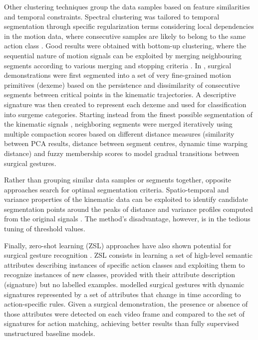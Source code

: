 \documentclass[journal]{IEEEtran}
\begin{document}
Other clustering techniques group the data samples based on feature similarities and temporal constraints.
Spectral clustering was tailored to temporal segmentation through specific regularization terms considering local dependencies in the motion data, where consecutive samples are likely to belong to the same action class \cite{Clopton2017}.
Good results were obtained with bottom-up clustering, where the sequential nature of motion signals can be exploited by merging neighbouring segments according to various merging and stopping criteria \cite{Despinoy2016, Fard2017}. 
In \cite{Despinoy2016}, surgical demonstrations were first segmented into a set of very fine-grained motion primitives (dexeme) based on the persistence and dissimilarity of consecutive segments between critical points in the kinematic trajectories.
A descriptive signature was then created to represent each dexeme and used for classification into surgeme categories. 
Starting instead from the finest possible segmentation of the kinematic signals \cite{Fard2017},
neighboring segments were merged iteratively using multiple compaction scores based on different distance measures (similarity between PCA results, distance between segment centres, dynamic time warping distance) and fuzzy membership scores to model gradual transitions between surgical gestures.

Rather than grouping similar data samples or segments together, opposite approaches search for optimal segmentation criteria.
Spatio-temporal and variance properties of the kinematic data can be exploited
to identify candidate segmentation points around the peaks of distance and variance profiles computed from the original signals \cite{Tsai2019unsup}.  
The method's disadvantage, however, is in the tedious tuning of threshold values.

Finally, zero-shot learning (ZSL) approaches have also shown potential for surgical gesture recognition \cite{Jones2019}. 
ZSL consists in learning a set of high-level semantic attributes describing instances of specific action classes and exploiting them to recognize instances of new classes, provided with their attribute description (signature) but no labelled examples.
\cite{Jones2019} modelled surgical gestures with dynamic signatures represented by a set of attributes that change in time according to action-specific rules.
Given a surgical demonstration, the presence or absence of those attributes were detected on each video frame and compared to the set of signatures for action matching, achieving better results than fully supervised unstructured baseline models.
\end{document}
